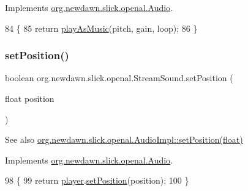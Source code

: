 Implements \mbox{\hyperlink{interfaceorg_1_1newdawn_1_1slick_1_1openal_1_1_audio_a69c3621a4a4bcbe9f1711f569c54017b}{org.\+newdawn.\+slick.\+openal.\+Audio}}.


\begin{DoxyCode}
84                                                                         \{
85         \textcolor{keywordflow}{return} \mbox{\hyperlink{classorg_1_1newdawn_1_1slick_1_1openal_1_1_stream_sound_ac7efc7d8db3fe1f34edae365c7d226fe}{playAsMusic}}(pitch, gain, loop);
86     \}
\end{DoxyCode}
\mbox{\label{classorg_1_1newdawn_1_1slick_1_1openal_1_1_stream_sound_aa530fe0393188182c1a956f6c381a937}} 
\subsubsection{\texorpdfstring{set\+Position()}{setPosition()}}
{\footnotesize\ttfamily boolean org.\+newdawn.\+slick.\+openal.\+Stream\+Sound.\+set\+Position (\begin{DoxyParamCaption}\item[{float}]{position }\end{DoxyParamCaption})\hspace{0.3cm}{\ttfamily [inline]}}

\begin{DoxySeeAlso}{See also}
\mbox{\hyperlink{classorg_1_1newdawn_1_1slick_1_1openal_1_1_audio_impl_a9291d2e2d534fdfbd6a50e4948de954f}{org.\+newdawn.\+slick.\+openal.\+Audio\+Impl\+::set\+Position(float)}} 
\end{DoxySeeAlso}


Implements \mbox{\hyperlink{interfaceorg_1_1newdawn_1_1slick_1_1openal_1_1_audio_ace6e2e6fd29f40a8fe5daf8b28bc75e7}{org.\+newdawn.\+slick.\+openal.\+Audio}}.


\begin{DoxyCode}
98                                                \{
99         \textcolor{keywordflow}{return} \mbox{\hyperlink{classorg_1_1newdawn_1_1slick_1_1openal_1_1_stream_sound_a5e4d0d6e22af804ce94996f6ab90872f}{player}}.\mbox{\hyperlink{classorg_1_1newdawn_1_1slick_1_1openal_1_1_open_a_l_stream_player_ae35c80f50f55bb5efc88aebf809f7d5b}{setPosition}}(position);
100     \}
\end{DoxyCode}
\mbox{\label{classorg_1_1newdawn_1_1slick_1_1openal_1_1_stream_sound_a60b0a64ffdf99dfde3e3679323cbd647}} 
